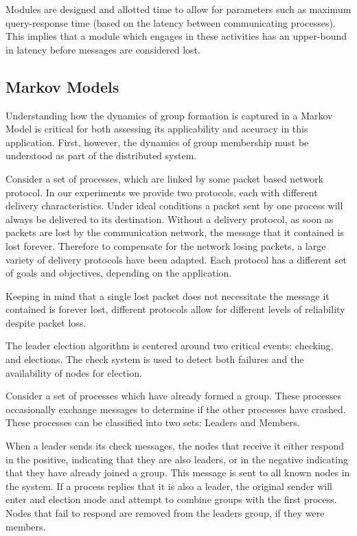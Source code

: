 Modules are designed and allotted time to allow for parameters such as maximum
query-response time (based on the latency between communicating processes). 
This implies that a module which engages in these activities has an
upper-bound in latency before messages are considered lost.

\subsection{Markov Models}
Understanding how the dynamics of group formation is captured in a Markov Model 
is critical for both assessing its applicability and accuracy in this 
application. First, however, the dynamics of group membership must be 
understood as part of the distributed system.

Consider a set of processes, which are linked by some packet based network 
protocol. In our experiments we provide two protocols, each with different 
delivery characteristics. Under ideal conditions a packet sent by one process 
will always be delivered to its destination. Without a delivery protocol, as 
soon as packets are lost by the communication network, the message that it 
contained is lost forever. Therefore to compensate for the network losing 
packets, a large variety of delivery protocols have been adapted. Each protocol 
has a different set of goals and objectives, depending on the application.

Keeping in mind that a single lost packet does not necessitate the message it 
contained is forever lost, different protocols allow for different levels of 
reliability despite packet loss.

The leader election algorithm is centered around two critical events: checking, 
and elections. The check system is used to detect both failures and the 
availability of nodes for election.

Consider a set of processes which have already formed a group. These processes 
occasionally exchange messages to determine if the other processes have 
crashed. These processes can be classified into two sets: Leaders and Members.

When a leader sends its check messages, the nodes that receive it either 
respond in the positive, indicating that they are also leaders, or in the 
negative indicating that they have already joined a group. This message is sent 
to all known nodes in the system. If a process replies that it is also a 
leader, the original sender will enter and election mode and attempt to combine 
groups with the first process. Nodes that fail to respond are removed from the 
leaders group, if they were members.

